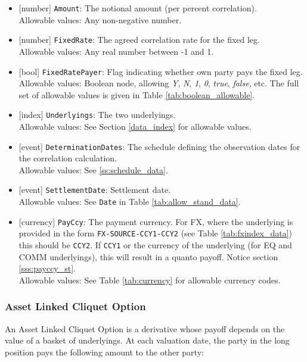 \begin{itemize}
  \item{}[number] \lstinline!Amount!: The notional amount (per percent correlation). \\
  Allowable values: Any non-negative number.
  \item{}[number] \lstinline!FixedRate!: The agreed correlation rate for the fixed leg. \\
  Allowable values: Any real number between -1 and 1.
  \item{}[bool] \lstinline!FixedRatePayer!: Flag indicating whether own party pays the fixed leg. \\
  Allowable values: Boolean node, allowing \emph{Y}, \emph{N}, \emph{1}, \emph{0}, \emph{true}, \emph{false}, etc.
  The full set of allowable values is given in Table \ref{tab:boolean_allowable}.
  \item{}[index] \lstinline!Underlyings!: The two underlyings. \\
  Allowable values: See Section \ref{data_index} for allowable values.
  \item{}[event] \lstinline!DeterminationDates!: The schedule defining the observation dates for the correlation calculation. \\
  Allowable values: See \ref{ss:schedule_data}.
  \item{}[event] \lstinline!SettlementDate!: Settlement date. \\
  Allowable values: See \lstinline!Date! in Table \ref{tab:allow_stand_data}.
  \item{}[currency] \lstinline!PayCcy!: The payment currency. For FX, where the underlying is provided
      in the form \lstinline!FX-SOURCE-CCY1-CCY2! (see Table \ref{tab:fxindex_data}) this should
      be \lstinline!CCY2!. If \lstinline!CCY1! or the currency of the underlying (for EQ and
      COMM underlyings), this will result in a quanto payoff. Notice section \ref{sss:payccy_st}. \\
        Allowable values: See Table \ref{tab:currency} for allowable currency codes.
\end{itemize}

\subsubsection{Asset Linked Cliquet Option}


An Asset Linked Cliquet Option is a derivative whose payoff depends on the value of a basket
of underlyings. At each valuation date, the party in the long position pays the following amount to the other party:

